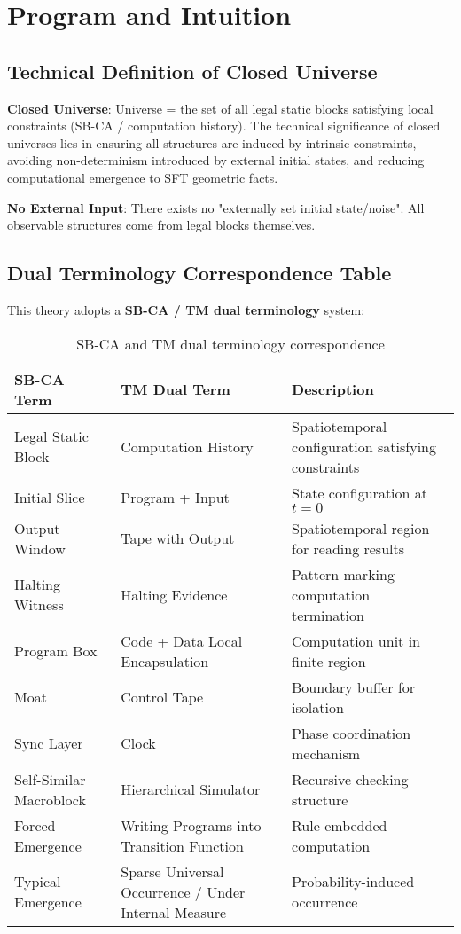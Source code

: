 \documentclass[12pt]{article}
\theoremstyle{plain}
\theoremstyle{definition}
\begin{document}
\section{Program and Intuition}

\subsection{Technical Definition of Closed Universe}

\textbf{Closed Universe}: Universe = the set of all legal static blocks satisfying local constraints (SB-CA / computation history). The technical significance of closed universes lies in ensuring all structures are induced by intrinsic constraints, avoiding non-determinism introduced by external initial states, and reducing computational emergence to SFT geometric facts.

\textbf{No External Input}: There exists no "externally set initial state/noise". All observable structures come from legal blocks themselves.

\subsection{Dual Terminology Correspondence Table}

This theory adopts a \textbf{SB-CA / TM dual terminology} system:

\begin{table}[h]
\centering
\caption{SB-CA and TM dual terminology correspondence}
\renewcommand{\arraystretch}{1.1}
\begin{tabularx}{\textwidth}{@{}>{\RaggedRight\arraybackslash}p{}
                               >{\RaggedRight\arraybackslash}X
                               >{\RaggedRight\arraybackslash}X@{}}
\toprule
\textbf{SB-CA Term} & \textbf{TM Dual Term} & \textbf{Description} \\
\midrule
Legal Static Block & Computation History & Spatiotemporal configuration satisfying constraints \\
Initial Slice & Program + Input & State configuration at $t=0$ \\
Output Window & Tape with Output & Spatiotemporal region for reading results \\
Halting Witness & Halting Evidence & Pattern marking computation termination \\
Program Box & Code + Data Local Encapsulation & Computation unit in finite region \\
Moat & Control Tape & Boundary buffer for isolation \\
Sync Layer & Clock & Phase coordination mechanism \\
Self-Similar Macroblock & Hierarchical Simulator & Recursive checking structure \\
Forced Emergence & Writing Programs into Transition Function & Rule-embedded computation \\
Typical Emergence & Sparse Universal Occurrence / Under Internal Measure & Probability-induced occurrence \\
\bottomrule
\end{tabularx}
\end{table}
\end{document}
